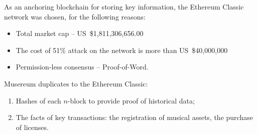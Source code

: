 \documentclass[12pt]{report}
\begin{document}
As an anchoring blockchain for storing key information, the Ethereum Classic network was chosen, for the following reasons:
\begin{itemize}
	\item Total market cap – US~\$1,811,306,656.00
	\item The cost of 51\% attack on the network is more than US~\$40,000,000
	\item Permission-less consensus – Proof-of-Word.
\end{itemize}

Musereum duplicates to the Ethereum Classic:
\begin{enumerate}
	\item Hashes of each $n$-block to provide proof of historical data;
	\item The facts of key transactions: the registration of musical assets, the purchase of licenses.
\end{enumerate}
\end{document}
